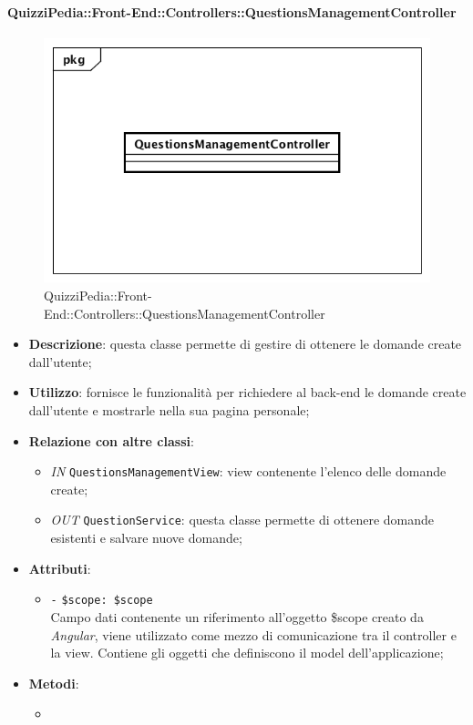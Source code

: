 \paragraph{QuizziPedia::Front-End::Controllers::QuestionsManagementController}
\begin{figure} [ht]
	\centering
	\includegraphics[scale=0.45]{UML/Classi/Front-End/QuizziPedia_Front-end_Controller_QuestionsManagementController.png}
	\caption{QuizziPedia::Front-End::Controllers::QuestionsManagementController}
\end{figure} \FloatBarrier
\begin{itemize}
	\item \textbf{Descrizione}: questa classe permette di gestire di ottenere le domande create dall'utente;
	\item \textbf{Utilizzo}: fornisce le funzionalità per richiedere al back-end le domande create dall'utente e mostrarle nella sua pagina personale; 
	\item \textbf{Relazione con altre classi}:
	\begin{itemize}
		\item \textit{IN} \texttt{QuestionsManagementView}: view contenente l'elenco delle domande create; 
		\item \textit{OUT} \texttt{QuestionService}: questa classe permette di ottenere domande esistenti e salvare nuove domande;
	\end{itemize}
	\item \textbf{Attributi}:
	\begin{itemize}
		\item \texttt{-} \texttt{\$scope: \$scope} \\
		Campo dati contenente un riferimento all’oggetto \$scope creato da \textit{Angular}, viene utilizzato come mezzo di comunicazione tra il controller e la view. Contiene gli oggetti che definiscono il model dell’applicazione;
	\end{itemize}
	\item \textbf{Metodi}:
	\begin{itemize}
		\item 
	\end{itemize}
\end{itemize}

